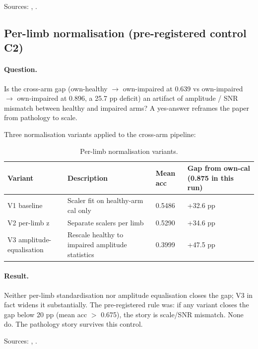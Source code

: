 \documentclass{article}
\begin{document}
Sources: , .

\subsection{Per-limb normalisation (pre-registered control C2)}
\label{app:normalisation}

\paragraph{Question.} Is the cross-arm gap (own-healthy $\rightarrow$ own-impaired at 0.639 vs own-impaired $\rightarrow$ own-impaired at 0.896, a 25.7 pp deficit) an artifact of amplitude / SNR mismatch between healthy and impaired arms? A yes-answer reframes the paper from pathology to scale.

Three normalisation variants applied to the cross-arm pipeline:

\begin{table}[h]
  \caption{Per-limb normalisation variants.}
  \label{tab:normalisation}
  \centering
  \small
  \begin{tabular}{llll}
    \toprule
    Variant & Description & Mean acc & Gap from own-cal (0.875 in this run) \\
    \midrule
    V1 baseline & Scaler fit on healthy-arm cal only & 0.5486 & +32.6 pp \\
    V2 per-limb z & Separate scalers per limb & 0.5290 & +34.6 pp \\
    V3 amplitude-equalisation & Rescale healthy to impaired amplitude statistics & 0.3999 & +47.5 pp \\
    \bottomrule
  \end{tabular}
\end{table}

\paragraph{Result.} Neither per-limb standardisation nor amplitude equalisation closes the gap; V3 in fact widens it substantially. The pre-registered rule was: if any variant closes the gap below 20 pp (mean acc $>$ 0.675), the story is scale/SNR mismatch. None do. The pathology story survives this control.

Sources: , .
\end{document}
